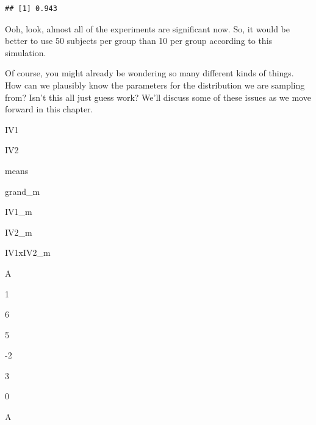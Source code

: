 \documentclass[]{book}
\newenvironment{Shaded}{\begin{snugshade}}{\end{snugshade}}
\newcommand{\ControlFlowTok}[1]{\textcolor[rgb]{0.13,0.29,0.53}{\textbf{#1}}}
\newcommand{\DataTypeTok}[1]{\textcolor[rgb]{0.13,0.29,0.53}{#1}}
\newcommand{\DecValTok}[1]{\textcolor[rgb]{0.00,0.00,0.81}{#1}}
\newcommand{\FloatTok}[1]{\textcolor[rgb]{0.00,0.00,0.81}{#1}}
\newcommand{\KeywordTok}[1]{\textcolor[rgb]{0.13,0.29,0.53}{\textbf{#1}}}
\newcommand{\NormalTok}[1]{#1}
\newcommand{\OperatorTok}[1]{\textcolor[rgb]{0.81,0.36,0.00}{\textbf{#1}}}
\newcommand{\OtherTok}[1]{\textcolor[rgb]{0.56,0.35,0.01}{#1}}
\newcommand{\StringTok}[1]{\textcolor[rgb]{0.31,0.60,0.02}{#1}}
\begin{document}
\begin{Shaded}
\end{Shaded}

\begin{verbatim}
## [1] 0.943
\end{verbatim}

Ooh, look, almost all of the experiments are significant now. So, it would be better to use 50 subjects per group than 10 per group according to this simulation.

Of course, you might already be wondering so many different kinds of things. How can we plausibly know the parameters for the distribution we are sampling from? Isn't this all just guess work? We'll discuss some of these issues as we move forward in this chapter.

IV1

IV2

means

grand\_m

IV1\_m

IV2\_m

IV1xIV2\_m

A

1

6

5

-2

3

0

A
\end{document}
